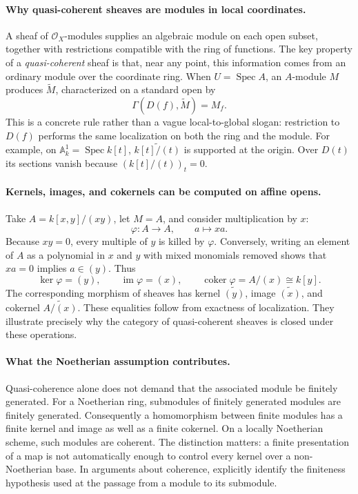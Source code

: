 \paragraph{Why quasi-coherent sheaves are modules in local coordinates.}
A sheaf of \(\mathcal O_X\)-modules supplies an algebraic module on each open
subset, together with restrictions compatible with the ring of functions.
The key property of a \emph{quasi-coherent} sheaf is that, near any point,
this information comes from an ordinary module over the coordinate ring.
When \(U=\operatorname{Spec}A\), an \(A\)-module \(M\) produces
\(\widetilde M\), characterized on a standard open by
\[
 \Gamma(D(f),\widetilde M)=M_f.
\]
This is a concrete rule rather than a vague local-to-global slogan:
restriction to \(D(f)\) performs the same localization on both the ring
and the module. For example, on \(\mathbb A^1_k=\operatorname{Spec}k[t]\),
\(\widetilde{k[t]/(t)}\) is supported at the origin. Over \(D(t)\) its
sections vanish because \((k[t]/(t))_t=0\).

\paragraph{Kernels, images, and cokernels can be computed on affine opens.}
Take \(A=k[x,y]/(xy)\), let \(M=A\), and consider multiplication by
\(x\):
\[
 \varphi:A\longrightarrow A,\qquad a\longmapsto xa.
\]
Because \(xy=0\), every multiple of \(y\) is killed by \(\varphi\).
Conversely, writing an element of \(A\) as a polynomial in \(x\)
and \(y\) with mixed monomials removed shows that \(xa=0\) implies
\(a\in(y)\). Thus
\[
 \ker\varphi=(y),\qquad \operatorname{im}\varphi=(x),\qquad
 \operatorname{coker}\varphi=A/(x)\cong k[y].
\]
The corresponding morphism of sheaves has kernel
\(\widetilde{(y)}\), image \(\widetilde{(x)}\), and cokernel
\(\widetilde{A/(x)}\). These equalities follow from exactness
of localization. They illustrate precisely why the category of
quasi-coherent sheaves is closed under these operations.

\paragraph{What the Noetherian assumption contributes.}
Quasi-coherence alone does not demand that the associated module be
finitely generated. For a Noetherian ring, submodules of finitely
generated modules are finitely generated. Consequently a homomorphism
between finite modules has a finite kernel and image as well as a finite
cokernel. On a locally Noetherian scheme, such modules are coherent.
The distinction matters: a finite presentation of a map is not
automatically enough to control every kernel over a non-Noetherian base.
In arguments about coherence, explicitly identify the finiteness
hypothesis used at the passage from a module to its submodule.

